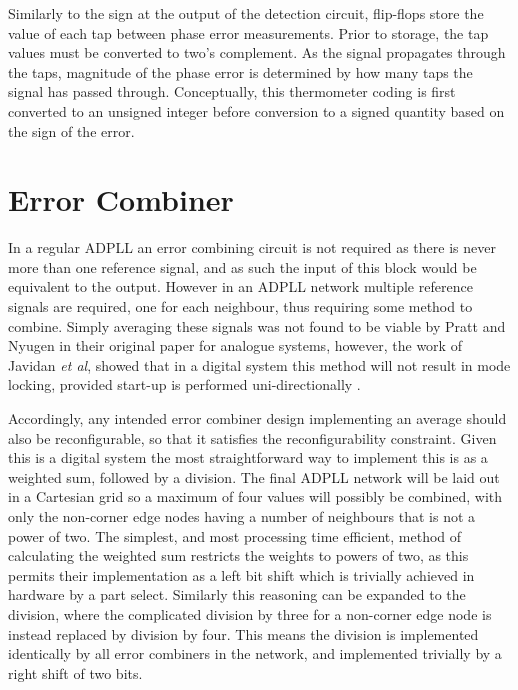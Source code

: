 Similarly to the sign at the output of the detection circuit, flip-flops store the value of each tap between phase error measurements. Prior to storage, the tap values must be converted to two's complement. As the signal propagates through the taps, magnitude of the phase error is determined by how many taps the signal has passed through. Conceptually, this thermometer coding is first converted to an unsigned integer before conversion to a signed quantity based on the sign of the error.

\section{Error Combiner}
In a regular \ac{ADPLL} an error combining circuit is not required as there is never more than one reference signal, and as such the input of this block would be equivalent to the output. However in an \ac{ADPLL} network multiple reference signals are required, one for each neighbour, thus requiring some method to combine. Simply averaging these signals was not found to be viable by Pratt and Nyugen in their original paper for analogue systems, however, the work of Javidan \textit{et al}, showed that in a digital system this method will not result in mode locking, provided start-up is performed uni-directionally \cite{javidan2011all}.

Accordingly, any intended error combiner design implementing an average should also be reconfigurable, so that it satisfies the reconfigurability constraint. Given this is a digital system the most straightforward way to implement this is as a weighted sum, followed by a division. The final \ac{ADPLL} network will be laid out in a Cartesian grid so a maximum of four values will possibly be combined, with only the non-corner edge nodes having a number of neighbours that is not a power of two.
The simplest, and most processing time efficient, method of calculating the weighted sum restricts the weights to powers of two, as this permits their implementation as a left bit shift which is trivially achieved in hardware by a part select.
Similarly this reasoning can be expanded to the division, where the complicated division by three for a non-corner edge node is instead replaced by division by four. This means the division is implemented identically by all error combiners in the network, and implemented trivially by a right shift of two bits.%

